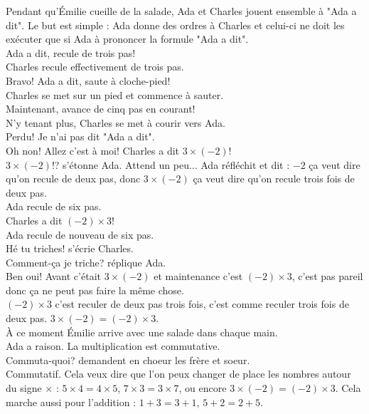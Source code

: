 Pendant qu'Émilie cueille de la salade, Ada et Charles jouent ensemble à "Ada a dit". Le but est simple : Ada donne des ordres à Charles et celui-ci ne doit les exécuter que si Ada à prononcer la formule "Ada a dit".\\
\guillemotleft Ada a dit, recule de trois pas!\guillemotright\\
Charles recule effectivement de trois pas.\\
\guillemotleft Bravo! Ada a dit, saute à cloche-pied!\guillemotright\\
Charles se met sur un pied et commence à sauter.\\
\guillemotleft Maintenant, avance de cinq pas en courant!\guillemotright\\
N'y tenant plus, Charles se met à courir vers Ada.\\
\guillemotleft Perdu! Je n'ai pas dit "Ada a dit".\\
\mdash Oh non! Allez c'est à moi! Charles a dit $3 \times (-2)$!\\
\mdash $3 \times (-2)$!? s'étonne Ada. Attend un peu... Ada réfléchit et dit : $-2$ ça veut dire qu'on recule de deux pas, donc $3 \times (-2)$ ça veut dire qu'on recule trois fois de deux pas.\guillemotright\\
Ada recule de six pas.\\
\guillemotleft Charles a dit $(-2) \times 3$!\guillemotright\\
Ada recule de nouveau de six pas.\\
\guillemotleft Hé tu triches! s'écrie Charles.\\
\mdash Comment-ça je triche? réplique Ada.\\
\mdash Ben oui! Avant c'était $3 \times (-2)$ et maintenance c'est $(-2) \times 3$, c'est pas pareil donc ça ne peut pas faire la même chose.\\
\mdash $(-2) \times 3$ c'est reculer de deux pas trois fois, c'est comme reculer trois fois de deux pas. $3 \times (-2) = (-2) \times 3$.\guillemotright\\
À ce moment Émilie arrive avec une salade dans chaque main.\\
\guillemotleft Ada a raison. La multiplication est commutative.\\
\mdash Commuta-quoi? demandent en choeur les frère et soeur.\\
\mdash Commutatif. Cela veux dire que l'on peux changer de place les nombres autour du signe $\times$ : $5 \times 4 = 4 \times 5$, $7 \times 3 = 3 \times 7$, ou encore $3 \times (-2) = (-2) \times 3$. Cela marche aussi pour l'addition : $1 +3 = 3 + 1$, $5 + 2 = 2 + 5$.\\
